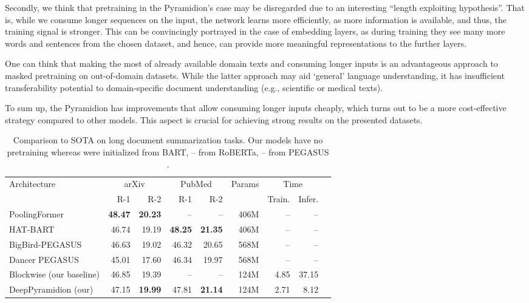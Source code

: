 \documentclass{article}
\begin{document}
Secondly, we think that pretraining in the Pyramidion’s case may be disregarded due to an interesting “length exploiting hypothesis”. That is, while we consume longer sequences on the input, the network learns more efficiently, as more information is available, and thus, the training signal is stronger. This can be convincingly portrayed in the case of embedding layers, as during training they see many more words and sentences from the chosen dataset, and hence, can provide more meaningful representations to the further layers.

One can think that making the most of already available domain texts and consuming longer inputs is an advantageous approach to masked pretraining on out-of-domain datasets. While the latter approach may aid ‘general’ language understanding, it has insufficient transferability potential to domain-specific document understanding (e.g.,  scientific or medical texts).

To sum up, the Pyramidion has improvements that allow consuming longer inputs cheaply, which turns out to be a more cost-effective strategy compared to other models. This aspect is crucial for achieving strong results on the presented datasets.

\begin{table*}[t]
    \caption{Comparison to SOTA on long document summarization tasks.
    Our models have no pretraining whereas  were initialized from BART,  -- from RoBERTa,  -- from PEGASUS  \citep{zhang2021poolingformer,rohde2021hierarchical,zaheer2020bigbird,gidiotis2020divideandconquer}.}
    \label{tab:sota}
    \centering
\begin{tabular}{lrrrrrrrr}
    \toprule
    \multirow{2}{*}{Architecture} &
    \multicolumn{2}{c}{arXiv} &
    \multicolumn{2}{c}{PubMed} &
    \multirow{2}{*}{Params} &
\multicolumn{2}{c}{Time}
\\
    & R-1 & R-2 & R-1 & R-2 & & Train. & Infer. \\
    \midrule
    PoolingFormer & \textbf{48.47}& \textbf{20.23} & -- & -- & 406M  & -- & -- \\
    HAT-BART & 46.74 & 19.19 & \textbf{48.25} & \textbf{21.35 }& 406M & -- & -- \\
    BigBird-PEGASUS & 46.63 & 19.02 & 46.32 & 20.65 &  568M & -- & -- \\
    Dancer PEGASUS & 45.01 & 17.60 & 46.34 & 19.97 & 568M & -- & -- \\
    \midrule
    Blockwise (our baseline) & 46.85 & 19.39 & -- & -- & 124M  & 4.85 & 37.15\\
    DeepPyramidion (our) & 47.15 & \textbf{19.99} & 47.81 & \textbf{21.14} & 124M & 2.71 & 8.12 \\
    \bottomrule
    \end{tabular}
\end{table*}
\end{document}
